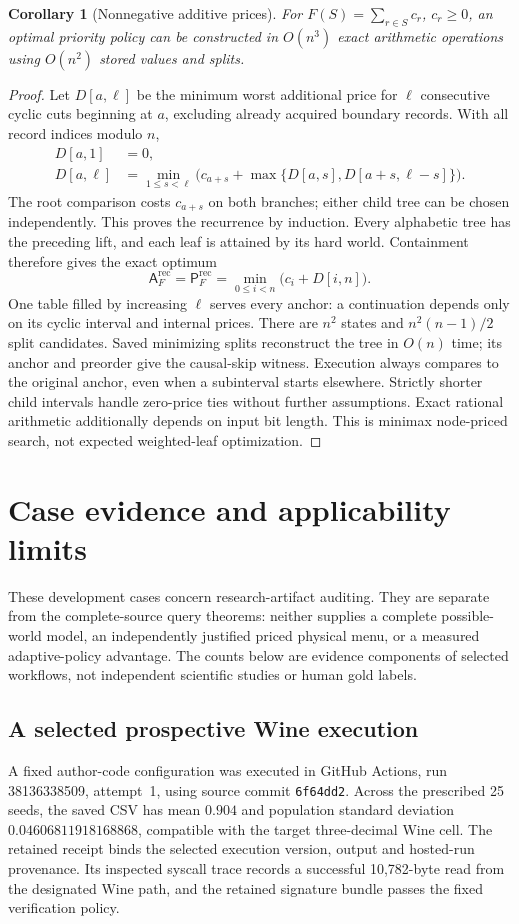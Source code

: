 \documentclass[pdflatex,sn-mathphys-num]{sn-jnl}
\newcommand{\A}{\mathsf{A}}
\newcommand{\Pcost}{\mathsf{P}}
\theoremstyle{thmstyleone}
\newtheorem{corollary}[theorem]{Corollary}
\theoremstyle{thmstylethree}
\theoremstyle{thmstyletwo}
\begin{document}
\begin{corollary}[Nonnegative additive prices]\label{cor:record-path-additive}
For $F(S)=\sum_{r\in S}c_r$, $c_r\geq0$, an optimal priority policy can be constructed in $O(n^3)$ exact arithmetic operations using $O(n^2)$ stored values and splits.
\end{corollary}
\begin{proof}
Let $D[a,\ell]$ be the minimum worst additional price for $\ell$ consecutive cyclic cuts beginning at $a$, excluding already acquired boundary records. With all record indices modulo $n$,
\begin{align*}
 D[a,1]&=0,\\
 D[a,\ell]&=\min_{1\leq s<\ell}
 \bigl(c_{a+s}+\max\{D[a,s],D[a+s,\ell-s]\}\bigr).
\end{align*}
The root comparison costs $c_{a+s}$ on both branches; either child tree can be chosen independently. This proves the recurrence by induction. Every alphabetic tree has the preceding lift, and each leaf is attained by its hard world. Containment therefore gives the exact optimum
\[
 \A_F^{\mathrm{rec}}=\Pcost_F^{\mathrm{rec}}
 =\min_{0\leq i<n}\bigl(c_i+D[i,n]\bigr).
\]
One table filled by increasing $\ell$ serves every anchor: a continuation depends only on its cyclic interval and internal prices. There are $n^2$ states and $n^2(n-1)/2$ split candidates. Saved minimizing splits reconstruct the tree in $O(n)$ time; its anchor and preorder give the causal-skip witness. Execution always compares to the original anchor, even when a subinterval starts elsewhere. Strictly shorter child intervals handle zero-price ties without further assumptions. Exact rational arithmetic additionally depends on input bit length. This is minimax node-priced search, not expected weighted-leaf optimization.
\end{proof}

\section{Case evidence and applicability limits}\label{app:cases}
These development cases concern research-artifact auditing. They are separate from the complete-source query theorems: neither supplies a complete possible-world model, an independently justified priced physical menu, or a measured adaptive-policy advantage. The counts below are evidence components of selected workflows, not independent scientific studies or human gold labels.

\subsection{A selected prospective Wine execution}
A fixed author-code configuration was executed in GitHub Actions, run 38136338509, attempt~1, using source commit \texttt{6f64dd2}. Across the prescribed 25 seeds, the saved CSV has mean $0.904$ and population standard deviation $0.04606811918168868$, compatible with the target three-decimal Wine cell. The retained receipt binds the selected execution version, output and hosted-run provenance. Its inspected syscall trace records a successful 10,782-byte read from the designated Wine path, and the retained signature bundle passes the fixed verification policy.
\end{document}
